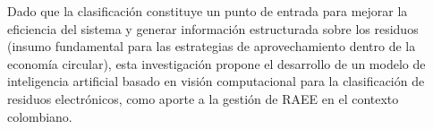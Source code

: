 Dado que la clasificación constituye un punto de entrada para mejorar la eficiencia del sistema y generar información estructurada sobre los residuos (insumo fundamental para las estrategias de aprovechamiento dentro de la economía circular), esta investigación propone el desarrollo de un modelo de inteligencia artificial basado en visión computacional para la clasificación de residuos electrónicos, como aporte a la gestión de RAEE en el contexto colombiano.